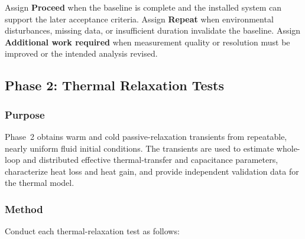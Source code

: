\documentclass[11pt]{article}
\begin{document}
Assign \textbf{Proceed} when the baseline is complete and the installed system can support the later acceptance criteria. Assign \textbf{Repeat} when environmental disturbances, missing data, or insufficient duration invalidate the baseline. Assign \textbf{Additional work required} when measurement quality or resolution must be improved or the intended analysis revised.

\subsection{Phase 2: Thermal Relaxation Tests}
\label{sec:relaxation}

\subsubsection{Purpose}

Phase~2 obtains warm and cold passive-relaxation transients from repeatable, nearly uniform fluid initial conditions. The transients are used to estimate whole-loop and distributed effective thermal-transfer and capacitance parameters, characterize heat loss and heat gain, and provide independent validation data for the thermal model.

\subsubsection{Method}

Conduct each thermal-relaxation test as follows:
\end{document}
